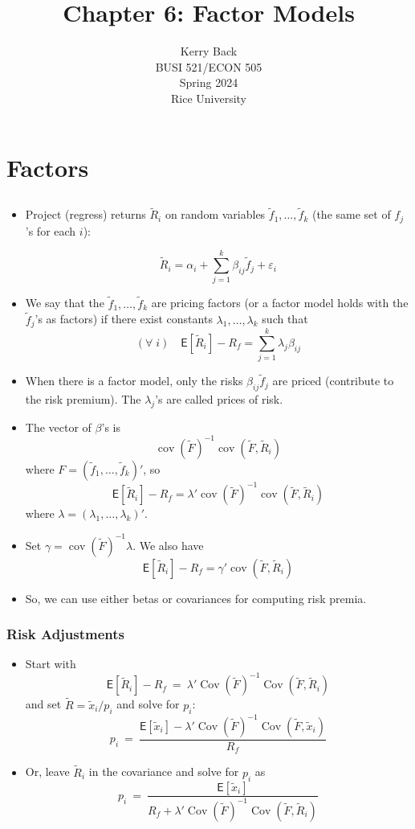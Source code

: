 \documentclass[10pt]{beamer}
\title{Chapter 6: Factor Models}
\date{}
\author{Kerry Back\\ 
BUSI 521/ECON 505\\
Spring 2024\\
Rice University}
\DeclareMathOperator{\cov}{cov}
\DeclareMathOperator{\Cov}{Cov}
\newcommand{\bi}{\begin{itemize}}
\newcommand{\ei}{\end{itemize}}
\newcommand{\im}{\item}
\newcommand{\mye}{\ensuremath{\mathsf{E}}}
\newcommand{\bfr}{\begin{frame}}
\newcommand{\tx}{\tilde{x}}
\newcommand{\tF}{\tilde{F}}
\newcommand{\tf}{\tilde{f}}
\newcommand{\tr}{\widetilde{R}}
\begin{document}
\maketitle




\section{Factors}\subsection{}

\begin{frame}[plain]
    \bi 
    \im Project (regress) returns $\tr_i$ on random variables $\tf_1, \ldots, \tf_k$ (the same set of $f_j$'s for each $i$):

    $$\tr_i = \alpha_i + \sum_{j=1}^k \beta_{ij} \tf_j + \varepsilon_i$$
    \im We say that the $\tf_1, \ldots, \tf_k$ are pricing factors (or a factor model holds with the $\tf_j$'s as factors) if there exist constants $\lambda_1, \ldots, \lambda_k$ such that
    $$(\forall\; i) \quad \mye[\tr_i] - R_f = \sum_{j=1}^k \lambda_j \beta_{ij}$$
    \im When there is a factor model, only the risks $\beta_{ij}\tf_j$ are priced (contribute to the risk premium).  The $\lambda_j$'s are called prices of risk.
    \ei\end{frame}

    \begin{frame}[plain]
        \bi 
    \im The vector of $\beta$'s is
    $$\cov(\tilde F)^{-1} \cov(\tilde F, \tr_i)$$
    where $F = (\tf_1, \ldots, \tf_k)'$, so
    $$\mye[\tr_i] - R_f = \lambda'\cov(\tilde F)^{-1} \cov(\tilde F, \tr_i)$$
    where $\lambda = (\lambda_1, \ldots, \lambda_k)'$.
    \im Set $\gamma = \cov(\tilde F)^{-1}\lambda$.  We also have
    $$\mye[\tr_i] - R_f = \gamma' \cov(\tilde F, \tr_i)$$
    \im So, we can use either betas or covariances for computing risk premia.
\ei 
\end{frame}


\bfr\frametitle{Risk Adjustments}
\bi 
\im Start with 
$$\mye[\tr_i]-R_f \ = \ \lambda' \Cov(\tF)^{-1}\Cov(\tF,\tr_i)$$
and set $\tr = \tx_i/p_i$ and solve for $p_i$:
$$p_i \ = \ \frac{\mye[\tx_i] - \lambda'\Cov(\tF)^{-1}\Cov(\tF,\tx_i)}{R_f}$$

\im Or, leave $\tr_i$ in the covariance and solve for $p_i$ as
$$p_i \ = \ \frac{\mye[\tx_i]}{R_f + \lambda'\Cov(\tF)^{-1}\Cov(\tF,\tr_i)}$$
\ei 
\end{frame}
\end{document}
